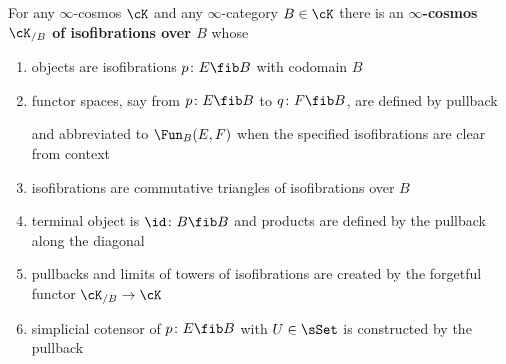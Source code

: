 \begin{proposition}\label{prop:sliced-cosmoi} 
  For any $\infty$-cosmos $\cK$ and any $\infty$-cat\-e\-gory $B \in \cK$ there is an \textbf{$\infty$-cosmos $\cK_{/B}$ of isofibrations over $B$} whose
\begin{enumerate}
\item\label{itm:sliced-objects} objects are isofibrations $p \colon E \fib B$ with codomain $B$
\item\label{itm:sliced-functor-space} functor spaces, say from $p \colon E \fib B$ to $q \colon F \fib B$, are defined by pullback
\begin{center}
\end{center}
and abbreviated to $\Fun_B(E,F)$ when the specified isofibrations are clear from context
\item\label{itm:sliced-isofibrations} isofibrations are commutative triangles of isofibrations over $B$
\begin{center}
\end{center}
\item\label{itm:sliced-products} terminal object is $\id \colon B \fib B$ and products are defined by the pullback along the diagonal
\begin{center}
\end{center}
\item\label{itm:sliced-pullbacks} pullbacks and limits of towers of isofibrations are created by the forgetful functor $\cK_{/B} \to \cK$
\item\label{itm:sliced-cotensors} simplicial cotensor of $p \colon E \fib B$ with $U \in \sSet$ is constructed by the pullback

\end{enumerate}
\end{proposition}
